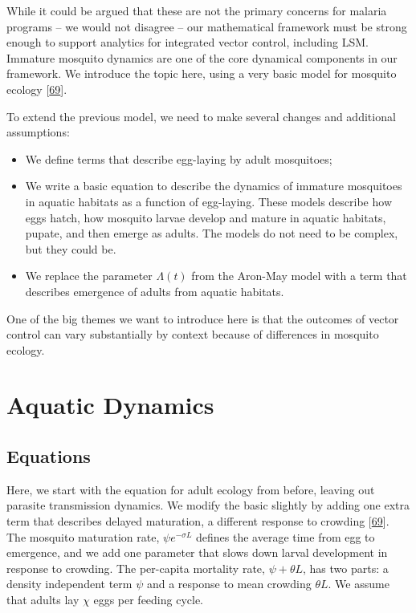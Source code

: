 \documentclass[
]{book}
\begin{document}
While it could be argued that these are not the primary concerns for malaria programs -- we would not disagree -- our mathematical framework must be strong enough to support analytics for integrated vector control, including LSM. Immature mosquito dynamics are one of the core dynamical components in our framework. We introduce the topic here, using a very basic model for mosquito ecology {[}\protect\hyperlink{ref-SmithDL2013_LarvalDynamics}{69}{]}.

To extend the previous model, we need to make several changes and additional assumptions:

\begin{itemize}
\item
  We define terms that describe egg-laying by adult mosquitoes;
\item
  We write a basic equation to describe the dynamics of immature mosquitoes in aquatic habitats as a function of egg-laying. These models describe how eggs hatch, how mosquito larvae develop and mature in aquatic habitats, pupate, and then emerge as adults. The models do not need to be complex, but they could be.
\item
  We replace the parameter \(\Lambda(t)\) from the Aron-May model with a term that
  describes emergence of adults from aquatic habitats.
\end{itemize}

One of the big themes we want to introduce here is that the outcomes of vector control can vary substantially by context because of differences in mosquito ecology.

\hypertarget{aquatic-dynamics}{%
\section{Aquatic Dynamics}\label{aquatic-dynamics}}

\hypertarget{equations}{%
\subsection{Equations}\label{equations}}

Here, we start with the equation for adult ecology from before, leaving out parasite transmission dynamics. We modify the basic slightly by adding one extra term that describes delayed maturation, a different response to crowding {[}\protect\hyperlink{ref-SmithDL2013_LarvalDynamics}{69}{]}. The mosquito maturation rate, \(\psi e^{-\sigma L}\) defines the average time from egg to emergence, and we add one parameter that slows down larval development in response to crowding. The per-capita mortality rate, \(\psi + \theta L\), has two parts: a density independent term \(\psi\) and a response to mean crowding \(\theta L\). We assume that adults lay \(\chi\) eggs per feeding cycle.
\end{document}
